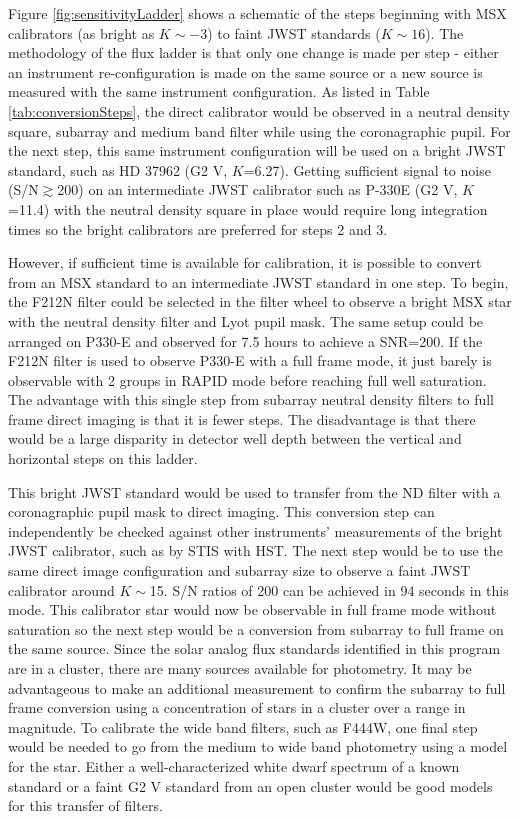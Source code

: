 \documentclass{aastex6}
\begin{document}
Figure \ref{fig:sensitivityLadder} shows a schematic of the steps beginning with MSX calibrators (as bright as $K \sim -3$) to faint JWST standards ($K \sim 16$).
The methodology of the flux ladder is that only one change is made per step - either an instrument re-configuration is made on the same source or a new source is measured with the same instrument configuration.
As listed in Table \ref{tab:conversionSteps}, the direct calibrator would be observed in a neutral density square, subarray and medium band filter while using the coronagraphic pupil.
For the next step, this same instrument configuration will be used on a bright JWST standard, such as HD 37962 (G2 V, $K$=6.27).
Getting sufficient signal to noise (S/N$\gtrsim$200) on an intermediate JWST calibrator such as P-330E (G2 V, $K$=11.4) with the neutral density square in place would require long integration times so the bright calibrators are preferred for steps 2 and 3.

However, if sufficient time is available for calibration, it is possible to convert from an MSX standard to an intermediate JWST standard in one step.
To begin, the F212N filter could be selected in the filter wheel to observe a bright MSX star with the neutral density filter and Lyot pupil mask.
The same setup could be arranged on P330-E and observed for 7.5 hours to achieve a SNR=200.
If the F212N filter is used to observe P330-E with a full frame mode, it just barely is observable with 2 groups in RAPID mode before reaching full well saturation.
The advantage with this single step from subarray neutral density filters to full frame direct imaging is that it is fewer steps.
The disadvantage is that there would be a large disparity in detector well depth between the vertical and horizontal steps on this ladder.

This bright JWST standard would be used to transfer from the ND filter with a coronagraphic pupil mask to direct imaging.
This conversion step can independently be checked against other instruments' measurements of the bright JWST calibrator, such as by STIS with HST.
The next step would be to use the same direct image configuration and subarray size to observe a faint JWST calibrator around $K \sim$15.
S/N ratios of 200 can be achieved in 94 seconds in this mode.
This calibrator star would now be observable in full frame mode without saturation so the next step would be a conversion from subarray to full frame on the same source.
Since the solar analog flux standards identified in this program are in a cluster, there are many sources available for photometry.
It may be advantageous to make an additional measurement to confirm the subarray to full frame conversion using a concentration of stars in a cluster over a range in magnitude.
To calibrate the wide band filters, such as F444W, one final step would be needed to go from the medium to wide band photometry using a model for the star.
Either a well-characterized white dwarf spectrum of a known standard or a faint G2 V standard from an open cluster would be good models for this transfer of filters.
\end{document}
